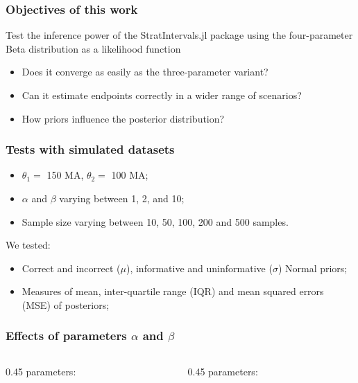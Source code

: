\documentclass[aspectratio=169]{beamer}
\begin{document}
\begin{frame}
	\frametitle{Objectives of this work} \pause

	Test the inference power of the StratIntervals.jl package using the four-parameter Beta distribution as a likelihood function \pause

	\begin{itemize}
		\item Does it converge as easily as the three-parameter variant? \pause
		\item Can it estimate endpoints correctly in a wider range of scenarios? \pause
		\item How priors influence the posterior distribution?
	\end{itemize}
\end{frame}

\begin{frame}
	\frametitle{Tests with simulated datasets} \pause

	\begin{itemize}
		\item $\theta_1 =$ 150 MA, $\theta_2 =$ 100 MA; \pause
		\item $\alpha$ and $\beta$ varying between 1, 2, and 10; \pause
		\item Sample size varying between 10, 50, 100, 200 and 500 samples. \pause
	\end{itemize}

	We tested: \pause
	\begin{itemize}
		\item Correct and incorrect ($\mu$), informative and uninformative ($\sigma$) Normal priors; \pause
		\item Measures of mean, inter-quartile range (IQR) and mean squared errors (MSE) of posteriors;
	\end{itemize}
\end{frame}

\begin{frame}
	\frametitle{Effects of parameters $\alpha$ and $\beta$}


  \vspace{1.5em}

	\begin{columns}
		\begin{column}{0.45\textwidth}
			 parameters:

			
		\end{column}
		\begin{column}{0.45\textwidth}
			 parameters:

			
		\end{column}
	\end{columns}
\end{frame}
\end{document}
